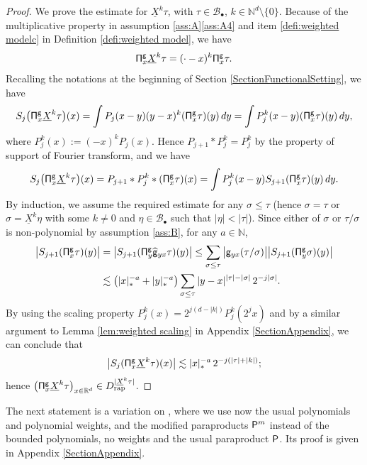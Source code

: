 \documentclass[10pt]{amsart}
\newcommand{\sbullet}{{\scriptscriptstyle\bullet}}
\theoremstyle{plain}
\theoremstyle{definition}
\newcommand{\rap}{\mathrm{rap}}
\newcommand{\sfg}{\mathsf{g}}
\newcommand{\bbN}{\mathbb{N}}
\newcommand{\bbR}{\mathbb{R}}
\newcommand{\mcB}{\mathcal{B}}
\begin{document}
\begin{proof}
We prove the estimate for $\underline{X}^k\tau$, with $\tau\in\mcB_\sbullet$, $k\in\bbN^d\setminus\{0\}$. Because of the multiplicative property in assumption \ref{ass:A}\eqref{ass:A4} and item \eqref{defi:weighted modelc} in Definition \ref{defi:weighted model}, we have
\[
{\sf\Pi}_x^{\sfg}\underline{X}^k\tau=(\cdot-x)^k{\sf\Pi}_x^{\sfg}\tau.
\]
Recalling the notations at the beginning of Section \ref{SectionFunctionalSetting}, we have
\begin{align*}
S_j\bigl({\sf\Pi}_x^{\sfg}\underline{X}^k\tau\bigr)(x)
= \int P_j(x-y)(y-x)^k({\sf\Pi}_x^{\sfg}\tau)(y)\,dy
= \int P_j^{k}(x-y)({\sf\Pi}_x^{\sfg}\tau)(y)\,dy,
\end{align*}
where $P_j^k(x):=(-x)^kP_j(x)$. Hence $P_{j+1}*P_j^k=P_j^k$ by the property of support of Fourier transform, and we have
\begin{align*}
S_j\bigl({\sf\Pi}_x^{\sfg}\underline{X}^k\tau\bigr)(x) = P_{j+1}*P_j^k*({\sf\Pi}_x^{\sfg}\tau)(x) = \int P_j^k(x-y)S_{j+1}({\sf\Pi}_x^{\sfg}\tau)(y)\,dy.
\end{align*}
By induction, we assume the required estimate for any $\sigma\le\tau$ (hence $\sigma=\tau$ or $\sigma=\underline{X}^k\eta$ with some $k\neq0$ and $\eta\in\mcB_\sbullet$ such that $|\eta|<|\tau|$).
Since either of $\sigma$ or $\tau/\sigma$ is non-polynomial by assumption \eqref{ass:B}, for any $a\in\bbN$,
\begin{align*}
\big|S_{j+1}({\sf\Pi}_x^{\sfg}\tau)(y)\big| &= \big|S_{j+1}({\sf\Pi}_y^{\sfg}\widehat{\sfg}_{yx}\tau)(y) \big|
\le\sum_{\sigma\le\tau} \big|\sfg_{yx}(\tau/\sigma)\big| \big|S_{j+1}({\sf\Pi}_y^{\sfg}\sigma)(y)\big| \\
&\lesssim \bigl(|x|_*^{-a}+|y|_*^{-a}\bigr) \sum_{\sigma\le\tau}|y-x|^{|\tau|-|\sigma|}\,2^{-j|\sigma|}.
\end{align*}
By using the scaling property $P_j^k(x)=2^{j(d-|k|)}P_j^k(2^jx)$ and by a similar argument to Lemma \ref{lem:weighted scaling} in Appendix \ref{SectionAppendix}, we can conclude that
\begin{align*}
\big|S_j({\sf\Pi}_x^{\sfg}\underline{X}^k\tau)(x)\big| \lesssim |x|_*^{-a}\,2^{-j(|\tau|+|k|)};
\end{align*}
hence $\bigl({\sf\Pi}_x^{\sfg}\underline{X}^k\tau\bigr)_{x\in\bbR^d}\in D_{\rap}^{|\underline{X}^k\tau|}$.
\end{proof}

The next statement is a variation on \cite[Prop.\,12]{BH}, where we use now the usual polynomials and polynomial weights, and the modified paraproducts ${\sf P}^m$ instead of the bounded polynomials, no weights and the usual paraproduct $\sf P$. Its proof is given in Appendix \ref{SectionAppendix}.
\end{document}
